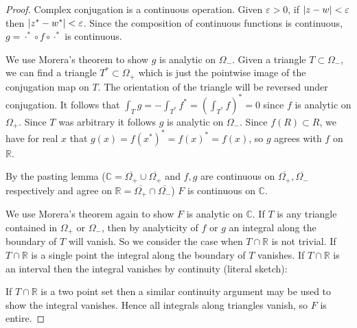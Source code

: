 \documentclass[12pt]{amsart}
\begin{document}
\begin{proof}
\baselineskip=24pt
Complex conjugation is a continuous operation. Given $\varepsilon>0$, if $\abs{z-w}<\varepsilon$ then $\abs{z^\ast-w^\ast}<\varepsilon$. Since the composition of continuous functions is continuous, $g= \cdot^\ast\circ f\circ \cdot^\ast$ is continuous. 

We use Morera's theorem to show $g$ is analytic on $\Omega_-$. Given a triangle $T\subset \Omega_-$, we can find a triangle $T^\ast\subset \Omega_+$ which is just the pointwise image of the conjugation map on $T$. The orientation of the triangle will be reversed under conjugation. It follows that $\int_T g = -\int_{T^\ast} f^\ast = (\int_{T^\ast}f)^\ast = 0$ since $f$ is analytic on $\Omega_+$. Since $T$ was arbitrary it follows $g$ is analytic on $\Omega_-$. Since $f(R)\subset R$, we have for real $x$ that $g(x) = f(x^\ast)^\ast = f(x)^\ast = f(x)$, so $g$ agrees with $f$ on $\mathbb{R}$.

By the pasting lemma ($\mathbb{C} = \overline{\Omega_+}\cup \overline{\Omega_+}$ and $f,g$ are continuous on $\overline{\Omega_+},\overline{\Omega_-}$ respectively and agree on $\mathbb{R} = \overline{\Omega_+}\cap \overline{\Omega_-}$) $F$ is continuous on $\mathbb{C}$.

We use Morera's theorem again to show $F$ is analytic on $\mathbb{C}$. If $T$ is any triangle contained in $\Omega_+$ or $\Omega_-$, then by analyticity of $f$ or $g$ an integral along the boundary of $T$ will vanish. So we consider the case when $T\cap \mathbb{R}$ is not trivial. If $T\cap \mathbb{R}$ is a single point the integral along the boundary of $T$ vanishes. If $T\cap \mathbb{R}$ is an interval then the integral vanishes by continuity (literal sketch): \vspace*{7cm}

If $T\cap \mathbb{R}$ is a two point set then a similar continuity argument may be used to show the integral vanishes. Hence all integrals along triangles vanish, so $F$ is entire.
\end{proof}
\end{document}
